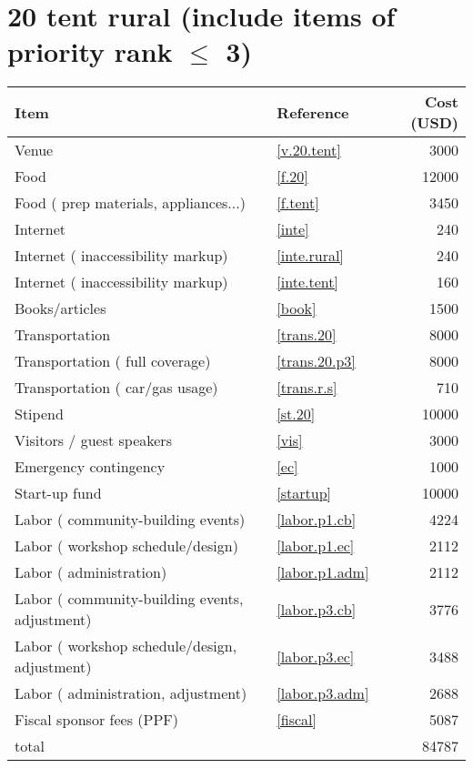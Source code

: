 \section*{20 tent rural (include items of priority rank $\leq$ 3)}
\begin{center}
\begin{tabular}{llr}
Item & Reference & Cost (USD) \\ \hline
Venue & \ref{v.20.tent} & 3000 \\
Food & \ref{f.20} & 12000 \\
Food ( prep materials, appliances...) & \ref{f.tent} & 3450 \\
Internet & \ref{inte} & 240 \\
Internet ( inaccessibility markup) & \ref{inte.rural} & 240 \\
Internet ( inaccessibility markup) & \ref{inte.tent} & 160 \\
Books/articles & \ref{book} & 1500 \\
Transportation & \ref{trans.20} & 8000 \\
Transportation ( full coverage) & \ref{trans.20.p3} & 8000 \\
Transportation ( car/gas usage) & \ref{trans.r.s} & 710 \\
Stipend & \ref{st.20} & 10000 \\
Visitors / guest speakers & \ref{vis} & 3000 \\
Emergency contingency & \ref{ec} & 1000 \\
Start-up fund & \ref{startup} & 10000 \\
Labor ( community-building events) & \ref{labor.p1.cb} & 4224 \\
Labor ( workshop schedule/design) & \ref{labor.p1.ec} & 2112 \\
Labor ( administration) & \ref{labor.p1.adm} & 2112 \\
Labor ( community-building events, adjustment) & \ref{labor.p3.cb} & 3776 \\
Labor ( workshop schedule/design, adjustment) & \ref{labor.p3.ec} & 3488 \\
Labor ( administration, adjustment) & \ref{labor.p3.adm} & 2688 \\
Fiscal sponsor fees (PPF) & \ref{fiscal} & 5087 \\ \hline
total &  & 84787
\end{tabular}
\end{center}
\newpage
